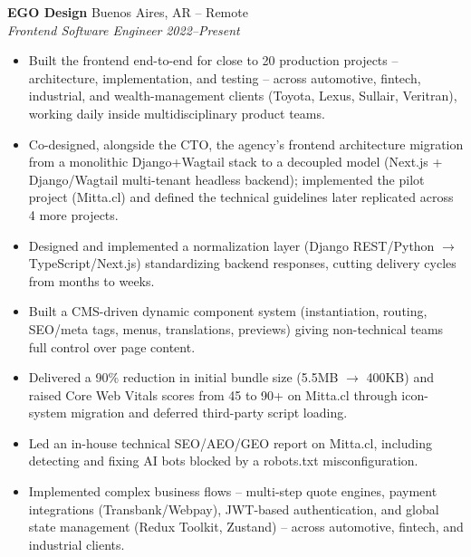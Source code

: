 \documentclass[10.5pt,a4paper]{article}
\newcommand{\cvheaderline}[2]{\textbf{#1} \hfill #2\\}
\newcommand{\cvsubheaderline}[2]{\textit{#1} \hfill \textit{#2}\\[1pt]}
\begin{document}
\cvheaderline{EGO Design}{Buenos Aires, AR -- Remote}
\cvsubheaderline{Frontend Software Engineer}{2022--Present}
\begin{itemize}
    \item Built the frontend end-to-end for close to 20 production projects -- architecture, implementation, and testing -- across automotive, fintech, industrial, and wealth-management clients (Toyota, Lexus, Sullair, Veritran), working daily inside multidisciplinary product teams.
    \item Co-designed, alongside the CTO, the agency's frontend architecture migration from a monolithic Django+Wagtail stack to a decoupled model (Next.js + Django/Wagtail multi-tenant headless backend); implemented the pilot project (Mitta.cl) and defined the technical guidelines later replicated across 4 more projects.
    \item Designed and implemented a normalization layer (Django REST/Python $\rightarrow$ TypeScript/Next.js) standardizing backend responses, cutting delivery cycles from months to weeks.
    \item Built a CMS-driven dynamic component system (instantiation, routing, SEO/meta tags, menus, translations, previews) giving non-technical teams full control over page content.
    \item Delivered a 90\% reduction in initial bundle size (5.5MB $\rightarrow$ 400KB) and raised Core Web Vitals scores from 45 to 90+ on Mitta.cl through icon-system migration and deferred third-party script loading.
    \item Led an in-house technical SEO/AEO/GEO report on Mitta.cl, including detecting and fixing AI bots blocked by a robots.txt misconfiguration.
    \item Implemented complex business flows -- multi-step quote engines, payment integrations (Transbank/Webpay), JWT-based authentication, and global state management (Redux Toolkit, Zustand) -- across automotive, fintech, and industrial clients.
\end{itemize}

\end{document}
